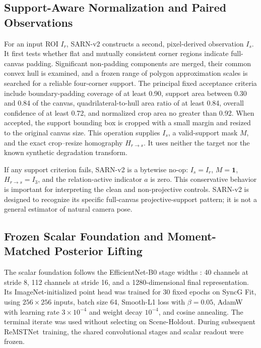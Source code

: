 \documentclass[electronics,article,submit,oneauthor]{Definitions/mdpi}
\newcommand{\modelname}{ReMSTNet}
\begin{document}
\subsection{Support-Aware Normalization and Paired Observations}
\label{subsec:sarn}

For an input ROI $I_r$, SARN-v2 constructs a second, pixel-derived observation $I_s$. It first tests whether flat and mutually consistent corner regions indicate full-canvas padding. Significant non-padding components are merged, their common convex hull is examined, and a frozen range of polygon approximation scales is searched for a reliable four-corner support. The principal fixed acceptance criteria include boundary-padding coverage of at least 0.90, support area between 0.30 and 0.84 of the canvas, quadrilateral-to-hull area ratio of at least 0.84, overall confidence of at least 0.72, and normalized crop area no greater than 0.92. When accepted, the support bounding box is cropped with a small margin and resized to the original canvas size. This operation supplies $I_s$, a valid-support mask $M$, and the exact crop--resize homography $H_{r\rightarrow s}$. It uses neither the target nor the known synthetic degradation transform.

If any support criterion fails, SARN-v2 is a bytewise no-op: $I_s=I_r$, $M=\mathbf{1}$, $H_{r\rightarrow s}=I_3$, and the relation-active indicator $a$ is zero. This conservative behavior is important for interpreting the clean and non-projective controls. SARN-v2 is designed to recognize its specific full-canvas projective-support pattern; it is not a general estimator of natural camera pose.

\subsection{Frozen Scalar Foundation and Moment-Matched Posterior Lifting}
\label{subsec:foundation}

The scalar foundation follows the EfficientNet-B0 stage widths \cite{tan2019efficientnet}: 40 channels at stride 8, 112 channels at stride 16, and a 1280-dimensional final representation. Its ImageNet-initialized point head was trained for 30 fixed epochs on SyncG Fit, using $256\times256$ inputs, batch size 64, Smooth-L1 loss with $\beta=0.05$, AdamW with learning rate $3\times10^{-4}$ and weight decay $10^{-4}$, and cosine annealing. The terminal iterate was used without selecting on Scene-Holdout. During subsequent \modelname\ training, the shared convolutional stages and scalar readout were frozen.
\end{document}
